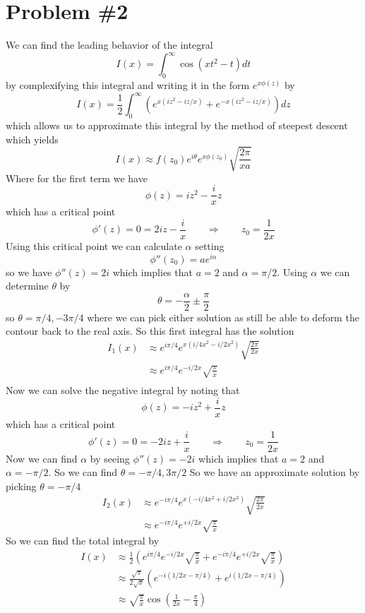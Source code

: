 \documentclass[11pt]{article}
\numberwithin{equation}{section}
\begin{document}
\section{Problem \#2}
We can find the leading behavior of the integral
$$I(x) = \int_{0}^{\infty}\cos\left(xt^2-t\right)dt$$
by complexifying this integral and writing it in the form $e^{x\phi(z)}$ by
$$I(x) = \frac{1}{2}\int_{0}^{\infty}\left(e^{x(iz^2-iz/x)}+e^{-x(iz^2-iz/x)}\right)dz$$
which allows us to approximate this integral by the method of steepest descent which yields
$$I(x) \approx f(z_0)e^{i\theta}e^{x\phi(z_0)}\sqrt{\frac{2\pi}{xa}}$$
Where for the first term we have
$$\phi(z) = iz^2-\frac{i}{x}z$$
which has a critical point
$$\phi'(z) = 0 = 2iz - \frac{i}{x} \qquad\Rightarrow\qquad z_0 = \frac{1}{2x}$$
Using this critical point we can calculate $\alpha$ setting
$$\phi''(z_0) = ae^{i\alpha}$$
so we have $\phi''(z) = 2i$ which implies that $a=2$ and $\alpha=\pi/2$. Using $\alpha$ we 
can determine $\theta$ by 
$$\theta = -\frac{\alpha}{2}\pm\frac{\pi}{2}$$
so $\theta = \pi/4,-3\pi/4$ where we can pick either solution as still be able to deform the
contour back to the real axis. So this first integral has the solution
\begin{align*}
I_1(x) &\approx e^{i\pi/4}e^{x(i/4x^2-i/2x^2)}\sqrt{\frac{2\pi}{2x}}\\
&\approx e^{i\pi/4}e^{-i/2x}\sqrt{\frac{\pi}{x}}\\
\end{align*}
Now we can solve the negative integral by noting that
$$\phi(z) = -iz^2+\frac{i}{x}z$$
which has a critical point
$$\phi'(z) = 0 = -2iz + \frac{i}{x} \qquad\Rightarrow\qquad z_0 = \frac{1}{2x}$$
Now we can find $\alpha$ by seeing $\phi''(z) = -2i$ which implies that $a=2$ and $\alpha=-\pi/2$.
So we can find $\theta = -\pi/4,3\pi/2$ So we have an approximate solution by picking 
$\theta=-\pi/4$
\begin{align*}
I_2(x) &\approx e^{-i\pi/4}e^{x(-i/4x^2+i/2x^2)}\sqrt{\frac{2\pi}{2x}}\\
&\approx e^{-i\pi/4}e^{+i/2x}\sqrt{\frac{\pi}{x}}
\end{align*}
So we can find the total integral by
\begin{align*}
I(x) &\approx \frac{1}{2}\left(e^{i\pi/4}e^{-i/2x}\sqrt{\frac{\pi}{x}} + e^{-i\pi/4}e^{+i/2x}\sqrt{\frac{\pi}{x}}\right)\\
&\approx \frac{\sqrt{\pi}}{2\sqrt{x}}\left(e^{-i(1/2x-\pi/4)} + e^{i(1/2x-\pi/4)}\right)\\
&\approx \sqrt{\frac{\pi}{x}}\cos\left(\frac{1}{2x}-\frac{\pi}{4}\right)
\end{align*}
\end{document}
